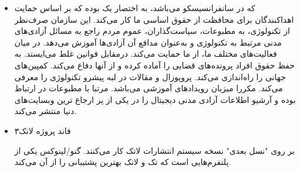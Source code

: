 \begin{itemize}
\item
{}

که در سانفرانسیسکو می‌باشد، به اختصار  یک
بوده که بر اساس حمایت اهداکنندگان برای محافظت از حقوق
اساسی ما کار می‌کند. این سازمان صرف‌نظر از تکنولوژی، به
مطبوعات، سیاست‌گذاران، عموم مردم راجع به مسائل آزادی‌های مدنی
مرتبط به تکنولوژی و به‌عنوان مدافع آن آزادی‌ها آموزش می‌دهد.
در میان فعالیت‌های مختلف ما،  از ما حمایت می‌کند.
درمقابل قوانین غلط می‌ایستد. به حفظ حقوق افراد پرونده‌های
قضایی را آماده کرده و از آنها دفاع می‌کند. کمپین‌های جهانی
را راه‌اندازی می‌کند. پروپوزال و مقالات در لبه پیشرو تکنولوژی
را معرفی می‌کند. مکررا میزبان رویدادهای آموزشی می‌باشد.
مرتبا با مطبوعات در ارتباط بوده و آرشیو اطلاعات آزادی مدنی
دیجیتال را در یکی از پر ارجاع ترین وبسایت‌های دنیا منتشر می‌کند.







\item
فاند پروژه لاتک۳

بر روی "نسل بعدی" نسخه سیستم انتشارات لاتک کار می‌کنند. گنو/لینوکس
یکی از پلتفرم‌هایی است که تک و لاتک بهترین پشتیبانی را از آن می‌کند.





\end{itemize}

